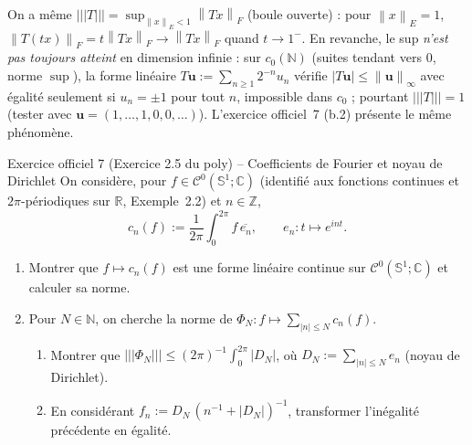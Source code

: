 \documentclass[11pt,a4paper]{article}
\newcommand{\R}{\mathbb{R}}
\newcommand{\N}{\mathbb{N}}
\newcommand{\Z}{\mathbb{Z}}
\newcommand{\C}{\mathbb{C}}
\newcommand{\Sun}{\mathbb{S}^1}
\newcommand{\norm}[1]{\left\|#1\right\|}
\newcommand{\opnorm}[1]{|\!|\!|#1|\!|\!|}
\newcommand{\Cz}{\mathcal{C}^0}
\theoremstyle{definition}
\begin{document}
\begin{commentaire}
On a même $\opnorm T=\sup_{\norm x_E<1}\norm{Tx}_F$ (boule ouverte) : pour $\norm x_E=1$, $\norm{T(tx)}_F=t\norm{Tx}_F\to\norm{Tx}_F$ quand $t\to1^-$. En revanche, le sup \emph{n'est pas toujours atteint} en dimension infinie : sur $c_0(\N)$ (suites tendant vers $0$, norme $\sup$), la forme linéaire $T\mathbf u:=\sum_{n\ge1}2^{-n}u_n$ vérifie $|T\mathbf u|\le\norm{\mathbf u}_\infty$ avec égalité seulement si $u_n=\pm1$ pour tout $n$, impossible dans $c_0$ ; pourtant $\opnorm T=1$ (tester avec $\mathbf u=(1,\dots,1,0,0,\dots)$). L'exercice officiel~7 (b.2) présente le même phénomène.
\end{commentaire}

\begin{exo}{Exercice officiel 7 (Exercice 2.5 du poly) -- Coefficients de Fourier et noyau de Dirichlet}
On considère, pour $f\in\Cz(\Sun;\C)$ (identifié aux fonctions continues et $2\pi$-périodiques sur $\R$, Exemple~2.2) et $n\in\Z$,
\[
c_n(f):=\frac1{2\pi}\int_0^{2\pi}f\,\overline{e_n},\qquad e_n:t\mapsto e^{int}.
\]
\begin{enumerate}[label=(\alph*)]
  \item Montrer que $f\mapsto c_n(f)$ est une forme linéaire continue sur $\Cz(\Sun;\C)$ et calculer sa norme.
  \item Pour $N\in\N$, on cherche la norme de $\Phi_N:f\mapsto\sum_{|n|\le N}c_n(f)$.
  \begin{enumerate}[label=(b.\arabic*)]
    \item Montrer que $\opnorm{\Phi_N}\le(2\pi)^{-1}\int_0^{2\pi}|D_N|$, où $D_N:=\sum_{|n|\le N}e_n$ (noyau de Dirichlet).
    \item En considérant $f_n:=D_N\,(n^{-1}+|D_N|)^{-1}$, transformer l'inégalité précédente en égalité.
  \end{enumerate}
\end{enumerate}
\end{exo}
\end{document}
